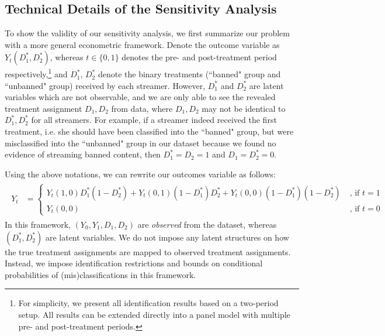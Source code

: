 \documentclass[a4paper,12pt]{article}
\begin{document}
\subsection{Technical Details of the Sensitivity Analysis}

To show the validity of our sensitivity analysis, we first summarize our problem with a more general econometric framework. Denote the outcome variable as $Y_t(D_1^\ast, D_2^\ast)$, whereas $t \in \{0,1\}$ denotes the pre- and post-treatment period respectively,\footnote{For simplicity, we present all identification results based on a two-period setup. All results can be extended directly into a panel model with multiple pre- and post-treatment periods.} and $D_1^\ast$, $D_2^\ast$ denote the binary treatments (``banned" group and ``unbanned" group) received by each streamer. However, $D_1^\ast$ and $D_2^\ast$ are latent variables which are not observable, and we are only able to see the revealed treatment assignment $D_1, D_2$ from data, where $D_1, D_2$ may not be identical to $D_1^\ast, D_2^\ast$ for all streamers. For example, if a streamer indeed received the first treatment, i.e. she should have been classified into the ``banned" group, but were misclassified into the ``unbanned" group in our dataset because we found no evidence of streaming banned content, then $D_1^\ast = D_2 = 1$ and $D_1 = D_2^\ast = 0$.

Using the above notations, we can rewrite our outcomes variable as follows:
\begin{align}\label{model}
\begin{split}
    Y_t &= \begin{cases}
        Y_t(1,0)D_1^\ast(1-D_2^\ast) + Y_t(0,1)(1-D_1^\ast)D_2^\ast + Y_t(0,0)(1-D_1^\ast)(1-D_2^\ast)\; & \text{, if } t=1\\
        Y_t(0,0) \; & \text{, if } t=0
    \end{cases}
\end{split}
\end{align}
In this framework, $(Y_0,Y_1,D_1,D_2)$ are \textit{observed} from the dataset, whereas $(D_1^\ast, D_2^\ast)$ are latent variables. We do not impose any latent structures on how the true treatment assignments are mapped to observed treatment assignments. Instead, we impose identification restrictions and bounds on conditional probabilities of (mis)classifications in this framework.

\end{document}
